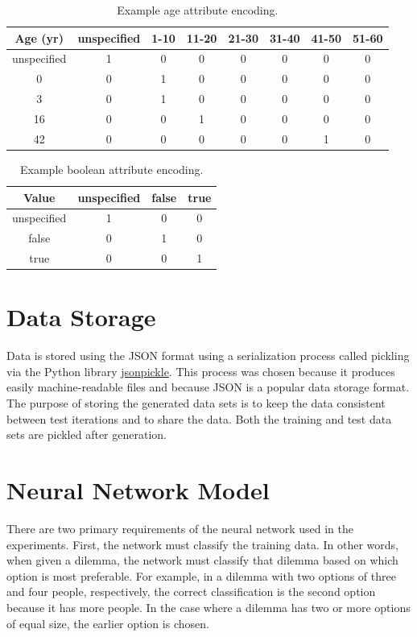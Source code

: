 \documentclass{report}
\begin{document}
\begin{table}[h]
    \centering
    \begin{tabular}{c|c|c|c|c|c|c|c}
        Age (yr) & unspecified & 1-10 & 11-20 & 21-30 & 31-40 & 41-50 & 51-60 \\\hline
        unspecified & 1 & 0 & 0 & 0 & 0 & 0 & 0 \\
        0 & 0 & 1 & 0 & 0 & 0 & 0 & 0 \\
        3 & 0 & 1 & 0 & 0 & 0 & 0 & 0 \\
        16 & 0 & 0 & 1 & 0 & 0 & 0 & 0 \\
        42 & 0 & 0 & 0 & 0 & 0 & 1 & 0
    \end{tabular}
    \caption{Example age attribute encoding.}
    \label{tab:example_age_attribute_encoding}
\end{table}

\begin{table}[h]
    \centering
    \begin{tabular}{c|c|c|c}
        Value & unspecified & false & true \\\hline
        unspecified & 1 & 0 & 0 \\
        false & 0 & 1 & 0 \\
        true & 0 & 0 & 1
    \end{tabular}
    \caption{Example boolean attribute encoding.}
    \label{tab:example_boolean_attribute_encoding}
\end{table}

\FloatBarrier
\section{Data Storage}

Data is stored using the JSON format using a serialization process called pickling via the Python
library \href{https://jsonpickle.github.io/}{jsonpickle}. This process was chosen because it
produces easily machine-readable files and because JSON is a popular data storage format. The
purpose of storing the generated data sets is to keep the data consistent between test iterations
and to share the data. Both the training and test data sets are pickled after generation.

\FloatBarrier
\section{Neural Network Model}

There are two primary requirements of the neural network used in the experiments. First, the network
must classify the training data. In other words, when given a dilemma, the network must classify
that dilemma based on which option is most preferable. For example, in a dilemma with two options of
three and four people, respectively, the correct classification is the second option because it has
more people. In the case where a dilemma has two or more options of equal size, the earlier option
is chosen.
\end{document}
